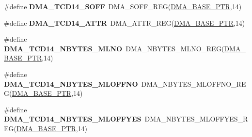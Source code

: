 \begin{DoxyCompactItemize}
\item 
\hypertarget{group___d_m_a___register___accessor___macros_gaddb2f2f5de001a3b004aa70b37435628}{}\#define {\bfseries D\+M\+A\+\_\+\+T\+C\+D14\+\_\+\+S\+O\+F\+F}~D\+M\+A\+\_\+\+S\+O\+F\+F\+\_\+\+R\+E\+G(\hyperlink{group___d_m_a___peripheral_ga6997fbc1b1973e9f27170217a3bd6f22}{D\+M\+A\+\_\+\+B\+A\+S\+E\+\_\+\+P\+T\+R},14)\label{group___d_m_a___register___accessor___macros_gaddb2f2f5de001a3b004aa70b37435628}

\item 
\hypertarget{group___d_m_a___register___accessor___macros_ga28f6a5c3e58f81c56650128d0d384d17}{}\#define {\bfseries D\+M\+A\+\_\+\+T\+C\+D14\+\_\+\+A\+T\+T\+R}~D\+M\+A\+\_\+\+A\+T\+T\+R\+\_\+\+R\+E\+G(\hyperlink{group___d_m_a___peripheral_ga6997fbc1b1973e9f27170217a3bd6f22}{D\+M\+A\+\_\+\+B\+A\+S\+E\+\_\+\+P\+T\+R},14)\label{group___d_m_a___register___accessor___macros_ga28f6a5c3e58f81c56650128d0d384d17}

\item 
\hypertarget{group___d_m_a___register___accessor___macros_gad159ef0686c8df4b74a7ec03a33daa2f}{}\#define {\bfseries D\+M\+A\+\_\+\+T\+C\+D14\+\_\+\+N\+B\+Y\+T\+E\+S\+\_\+\+M\+L\+N\+O}~D\+M\+A\+\_\+\+N\+B\+Y\+T\+E\+S\+\_\+\+M\+L\+N\+O\+\_\+\+R\+E\+G(\hyperlink{group___d_m_a___peripheral_ga6997fbc1b1973e9f27170217a3bd6f22}{D\+M\+A\+\_\+\+B\+A\+S\+E\+\_\+\+P\+T\+R},14)\label{group___d_m_a___register___accessor___macros_gad159ef0686c8df4b74a7ec03a33daa2f}

\item 
\hypertarget{group___d_m_a___register___accessor___macros_ga6fc9c29bae31d5e07932ea7271bd3d02}{}\#define {\bfseries D\+M\+A\+\_\+\+T\+C\+D14\+\_\+\+N\+B\+Y\+T\+E\+S\+\_\+\+M\+L\+O\+F\+F\+N\+O}~D\+M\+A\+\_\+\+N\+B\+Y\+T\+E\+S\+\_\+\+M\+L\+O\+F\+F\+N\+O\+\_\+\+R\+E\+G(\hyperlink{group___d_m_a___peripheral_ga6997fbc1b1973e9f27170217a3bd6f22}{D\+M\+A\+\_\+\+B\+A\+S\+E\+\_\+\+P\+T\+R},14)\label{group___d_m_a___register___accessor___macros_ga6fc9c29bae31d5e07932ea7271bd3d02}

\item 
\hypertarget{group___d_m_a___register___accessor___macros_ga47cbe5e87621d4d2b323561413ac05b5}{}\#define {\bfseries D\+M\+A\+\_\+\+T\+C\+D14\+\_\+\+N\+B\+Y\+T\+E\+S\+\_\+\+M\+L\+O\+F\+F\+Y\+E\+S}~D\+M\+A\+\_\+\+N\+B\+Y\+T\+E\+S\+\_\+\+M\+L\+O\+F\+F\+Y\+E\+S\+\_\+\+R\+E\+G(\hyperlink{group___d_m_a___peripheral_ga6997fbc1b1973e9f27170217a3bd6f22}{D\+M\+A\+\_\+\+B\+A\+S\+E\+\_\+\+P\+T\+R},14)\label{group___d_m_a___register___accessor___macros_ga47cbe5e87621d4d2b323561413ac05b5}


\end{DoxyCompactItemize}
